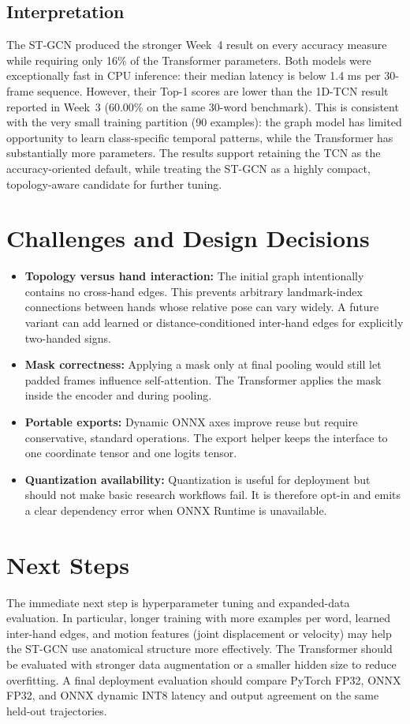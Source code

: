 \documentclass{article}
\begin{document}
\subsection*{Interpretation}
The ST-GCN produced the stronger Week~4 result on every accuracy measure while requiring only 16\% of the Transformer parameters. Both models were exceptionally fast in CPU inference: their median latency is below 1.4 ms per 30-frame sequence. However, their Top-1 scores are lower than the 1D-TCN result reported in Week~3 (60.00\% on the same 30-word benchmark). This is consistent with the very small training partition (90 examples): the graph model has limited opportunity to learn class-specific temporal patterns, while the Transformer has substantially more parameters. The results support retaining the TCN as the accuracy-oriented default, while treating the ST-GCN as a highly compact, topology-aware candidate for further tuning.

\section*{Challenges and Design Decisions}
\begin{itemize}
    \item \textbf{Topology versus hand interaction:} The initial graph intentionally contains no cross-hand edges. This prevents arbitrary landmark-index connections between hands whose relative pose can vary widely. A future variant can add learned or distance-conditioned inter-hand edges for explicitly two-handed signs.
    \item \textbf{Mask correctness:} Applying a mask only at final pooling would still let padded frames influence self-attention. The Transformer applies the mask inside the encoder and during pooling.
    \item \textbf{Portable exports:} Dynamic ONNX axes improve reuse but require conservative, standard operations. The export helper keeps the interface to one coordinate tensor and one logits tensor.
    \item \textbf{Quantization availability:} Quantization is useful for deployment but should not make basic research workflows fail. It is therefore opt-in and emits a clear dependency error when ONNX Runtime is unavailable.
\end{itemize}

\section*{Next Steps}
The immediate next step is hyperparameter tuning and expanded-data evaluation. In particular, longer training with more examples per word, learned inter-hand edges, and motion features (joint displacement or velocity) may help the ST-GCN use anatomical structure more effectively. The Transformer should be evaluated with stronger data augmentation or a smaller hidden size to reduce overfitting. A final deployment evaluation should compare PyTorch FP32, ONNX FP32, and ONNX dynamic INT8 latency and output agreement on the same held-out trajectories.
\end{document}
